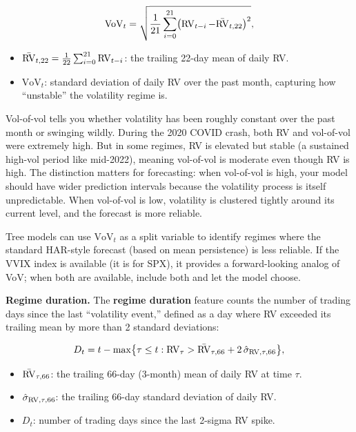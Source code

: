 \begin{equation}\label{eq:vol-of-vol}
\text{VoV}_t = \sqrt{\frac{1}{21}\sum_{i=0}^{21} \bigl(\operatorname{RV}_{t-i} - \bar{\operatorname{RV}}_{t,22}\bigr)^2},
\end{equation}
\begin{itemize}[nosep]
  \item $\bar{\operatorname{RV}}_{t,22} = \frac{1}{22}\sum_{i=0}^{21} \operatorname{RV}_{t-i}$: the trailing 22-day mean of daily RV.
  \item $\text{VoV}_t$: standard deviation of daily RV over the past month, capturing how ``unstable'' the volatility regime is.
\end{itemize}

\begin{intuition}
Vol-of-vol tells you whether volatility has been roughly constant over the past month or swinging wildly.
During the 2020 COVID crash, both RV and vol-of-vol were extremely high.
But in some regimes, RV is elevated but stable (a sustained high-vol period like mid-2022), meaning vol-of-vol is moderate even though RV is high.
The distinction matters for forecasting: when vol-of-vol is high, your model should have wider prediction intervals because the volatility process is itself unpredictable.
When vol-of-vol is low, volatility is clustered tightly around its current level, and the forecast is more reliable.
\end{intuition}

\begin{projectconnection}
Tree models can use $\text{VoV}_t$ as a split variable to identify regimes where the standard HAR-style forecast (based on mean persistence) is less reliable.
If the VVIX index is available (it is for SPX), it provides a forward-looking analog of VoV; when both are available, include both and let the model choose.
\end{projectconnection}

\textbf{Regime duration.}
The \textbf{regime duration} feature counts the number of trading days since the last ``volatility event,'' defined as a day where RV exceeded its trailing mean by more than 2 standard deviations:

\begin{equation}\label{eq:regime-duration}
D_t = t - \max\bigl\{\tau \leq t : \operatorname{RV}_\tau > \bar{\operatorname{RV}}_{\tau,66} + 2\,\hat{\sigma}_{\operatorname{RV},\tau,66}\bigr\},
\end{equation}
\begin{itemize}[nosep]
  \item $\bar{\operatorname{RV}}_{\tau,66}$: the trailing 66-day (3-month) mean of daily RV at time $\tau$.
  \item $\hat{\sigma}_{\operatorname{RV},\tau,66}$: the trailing 66-day standard deviation of daily RV.
  \item $D_t$: number of trading days since the last 2-sigma RV spike.
\end{itemize}

